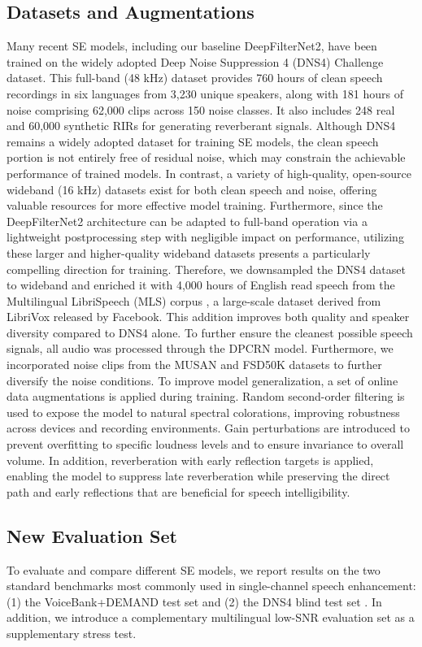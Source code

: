 \documentclass[final,5p,times,authoryear]{elsarticle}
\begin{document}
\subsection{Datasets and Augmentations}
\label{sec:datasets_and_aug}
Many recent SE models, including our baseline DeepFilterNet2, have been trained on the widely adopted Deep Noise Suppression 4 (DNS4) Challenge \citep{dns4} dataset. This full-band (48 kHz) dataset provides 760 hours of clean speech recordings in six languages from 3,230 unique speakers, along with 181 hours of noise comprising 62,000 clips across 150 noise classes. It also includes 248 real and 60,000 synthetic RIRs for generating reverberant signals.
%
Although DNS4 remains a widely adopted dataset for training SE models, the clean speech portion is not entirely free of residual noise, which may constrain the achievable performance of trained models. In contrast, a variety of high-quality, open-source wideband (16 kHz) datasets exist for both clean speech and noise, offering valuable resources for more effective model training. Furthermore, since the DeepFilterNet2 architecture can be adapted to full-band operation via a lightweight postprocessing step with negligible impact on performance, utilizing these larger and higher-quality wideband datasets presents a particularly compelling direction for training.
%
Therefore, we downsampled the DNS4 dataset to wideband and enriched it with 4,000 hours of English read speech from the Multilingual LibriSpeech (MLS) corpus \citep{fbmls2020}, a large-scale dataset derived from LibriVox released by Facebook. This addition improves both quality and speaker diversity compared to DNS4 alone. To further ensure the cleanest possible speech signals, all audio was processed through the DPCRN \citep{DPCRN} model. Furthermore, we incorporated noise clips from the MUSAN \citep{musan} and FSD50K \citep{fsd50k} datasets to further diversify the noise conditions.
%
To improve model generalization, a set of online data augmentations is applied during training. Random second-order filtering is used to expose the model to natural spectral colorations, improving robustness across devices and recording environments. Gain perturbations are introduced to prevent overfitting to specific loudness levels and to ensure invariance to overall volume. In addition, reverberation with early reflection targets is applied, enabling the model to suppress late reverberation while preserving the direct path and early reflections that are beneficial for speech intelligibility.

\subsection{New Evaluation Set}
\label{sec:new_eval_set}
To evaluate and compare different SE models, we report results on the two standard benchmarks most commonly used in single-channel speech enhancement: (1) the VoiceBank+DEMAND test set \citep{vctk_demand} and (2) the DNS4 blind test set \citep{dns4}. In addition, we introduce a complementary multilingual low-SNR evaluation set as a supplementary stress test.
\end{document}
